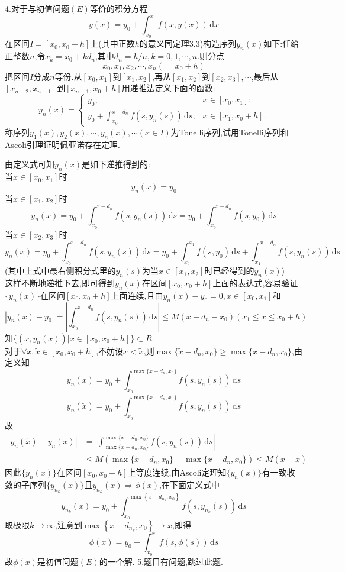 \documentclass[titlepage,11pt,a4paper,twoside]{report}
\makeatletter
\newcommand\diff{\,\mathrm{d}}
\renewenvironment{proof}{\par
	\pushQED{\qed}%
	\normalfont \topsep1\p@\@plus6\p@\relax
	\trivlist
	\item\relax
	{\hspace*{\parindent}{\heiti 证明}\@addpunct{:}}\hspace\labelsep\ignorespaces
}{%
	\popQED\endtrivlist\@endpefalse
}
\makeatother
\begin{document}
4.对于与初值问题$(E)$等价的积分方程
\[y(x)=y_0+\int_{x_0}^xf(x,y(x))\diff x\]
在区间$I=[x_0,x_0+h]$上(其中正数$h$的意义同定理3.3)构造序列$y_n(x)$如下:任给正整数$n$,令$x_k=x_0+kd_n$,其中$d_n=h/n,k=0,1,\cdots,n$.则分点
\[x_0,x_1,x_2,\cdots,x_n(=x_0+h)\]
把区间$I$分成$n$等份.从$[x_0,x_1]$到$[x_1,x_2]$,再从$[x_1,x_2]$到$[x_2,x_3],\cdots$,最后从$[x_{n-2},x_{n-1}]$到$[x_{n-1},x_0+h]$用递推法定义下面的函数:
\[y_n(x)=\begin{cases}
y_0,&x\in[x_0,x_1];\\
y_0+\int_{x_0}^{x-d_n}f(s,y_n(s))\diff s,&x\in[x_1,x_0+h].
\end{cases}\]
称序列$y_1(x),y_2(x),\cdots,y_n(x),\cdots(x\in I)$为Tonelli序列,试用Tonelli序列和Ascoli引理证明佩亚诺存在定理.
\begin{proof}
由定义式可知$y_n(x)$是如下递推得到的:\\
当$x\in[x_0,x_1]$时
\[y_n(x)=y_0\]
当$x\in[x_1,x_2]$时
\[y_n(x)=y_0+\int_{x_0}^{x-d_n}f(s,y_n(s))\diff s=y_0+\int_{x_0}^{x-d_n}f(s,y_0)\diff s\]
当$x\in[x_2,x_3]$时
\[y_n(x)=y_0+\int_{x_0}^{x-d_n}f(s,y_n(s))\diff s=y_0+\int_{x_0}^{x_1}f(s,y_0)\diff s+\int_{x_1}^{x-d_n}f(s,y_n(s))\diff s\]
(其中上式中最右侧积分式里的$y_n(s)$为当$x\in[x_1,x_2]$时已经得到的$y_n(x)$)\\
这样不断地递推下去,即可得到$y_n(x)$在区间$[x_0,x_0+h]$上面的表达式,容易验证$\{y_n(x)\}$在区间$[x_0,x_0+h]$上面连续,且由$y_n(x)-y_0=0,x\in[x_0,x_1]$和
\[|y_n(x)-y_0|=\left|\int_{x_0}^{x-d_n}f(s,y_n(s))\diff s\right|\leq M(x-d_n-x_0)(x_1\leq x\leq x_0+h)\]
知$\{(x,y_n(x))|x\in[x_0,x_0+h]\}\subset R$.\\
对于$\forall x,\tilde{x}\in[x_0,x_0+h]$,不妨设$x<\tilde{x}$,则$\max\{\tilde{x}-d_n,x_0\}\geq\max\{x-d_n,x_0\}$,由定义知
\[y_n(x)=y_0+\int_{x_0}^{\max\{x-d_n,x_0\}}f(s,y_n(s))\diff s\]
\[y_n(\tilde{x})=y_0+\int_{x_0}^{\max\{\tilde{x}-d_n,x_0\}}f(s,y_n(s))\diff s\]
故
\[\begin{split}|y_n(\tilde{x})-y_n(x)|&=\left|\int_{\max\{x-d_n,x_0\}}^{\max\{\tilde{x}-d_n,x_0\}}f(s,y_n(s))\diff s\right|\\
&\leq M(\max\{\tilde{x}-d_n,x_0\}-\max\{x-d_n,x_0\})\leq M(\tilde{x}-x)
\end{split}\]
因此$\{y_n(x)\}$在区间$[x_0,x_0+h]$上等度连续,由Ascoli定理知$\{y_n(x)\}$有一致收敛的子序列$\{y_{n_k}(x)\}$且$y_{n_k}(x)\Rightarrow\phi(x)$,在下面定义式中
\[y_{n_k}(x)=y_0+\int_{x_0}^{\max\left\{x-d_{n_k},x_0\right\}}f(s,y_{n_k}(s))\diff s\]
取极限$k\to\infty$,注意到$\max\left\{x-d_{n_k},x_0\right\}\to x$,即得
\[\phi(x)=y_0+\int_{x_0}^xf(s,\phi(s))\diff s\]
故$\phi(x)$是初值问题$(E)$的一个解.
\end{proof}
5.题目有问题,跳过此题.
\end{document}
